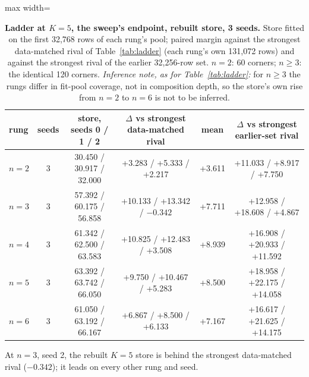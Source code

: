 \documentclass{article} %
\begin{document}
\begin{table}[h]
\centering\small
\caption{\textbf{Ladder at $K=5$, the sweep's endpoint, rebuilt store, 3 seeds.} Store fitted on the %
first 32,768 rows of each rung's pool; paired margin against the strongest data-matched rival of %
Table~\ref{tab:ladder} (each rung's own 131,072 rows) and against the strongest rival of the earlier %
32,256-row set. $n=2$: 60 corners; $n\ge3$: the identical 120 corners. \emph{Inference note, as for %
Table~\ref{tab:ladder}:} for $n\ge3$ the rungs differ in fit-pool coverage, not in composition
depth, so the store's own rise from $n=2$ to $n=6$ is not to be inferred.}
\label{tab:k5}
\setlength{\tabcolsep}{2.4pt}
\begin{adjustbox}{max width=\linewidth}\begin{tabular}{lccccc}
\toprule
rung & seeds & store, seeds 0 / 1 / 2 & $\Delta$ vs strongest data-matched rival & mean & $\Delta$ vs strongest earlier-set rival \\
\midrule
$n=2$ & 3 & 30.450 / 30.917 / 32.000 & +3.283 / +5.333 / +2.217 & +3.611 & +11.033 / +8.917 / +7.750 \\
$n=3$ & 3 & 57.392 / 60.175 / 56.858 & +10.133 / +13.342 / $-0.342$ & +7.711 & +12.958 / +18.608 / +4.867 \\
$n=4$ & 3 & 61.342 / 62.500 / 63.583 & +10.825 / +12.483 / +3.508 & +8.939 & +16.908 / +20.933 / +11.592 \\
$n=5$ & 3 & 63.392 / 63.742 / 66.050 & +9.750 / +10.467 / +5.283 & +8.500 & +18.958 / +22.175 / +14.058 \\
$n=6$ & 3 & 61.050 / 63.192 / 66.167 & +6.867 / +8.500 / +6.133 & +7.167 & +16.617 / +21.625 / +14.175 \\
\bottomrule
\end{tabular}\end{adjustbox}
\end{table}

\noindent At $n=3$, seed 2, the rebuilt $K=5$ store is behind the strongest data-matched rival %
($-0.342$); it leads on every other rung and seed. %
\end{document}
